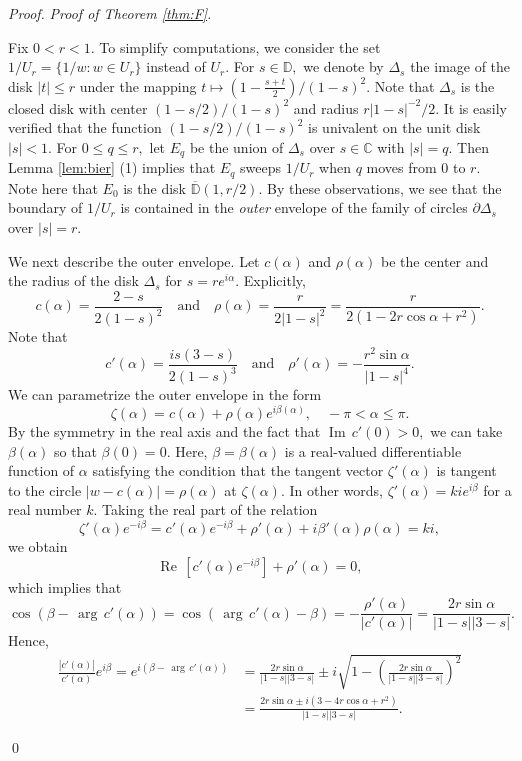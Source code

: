 \documentclass[a4paper,12pt]{amsart}
\numberwithin{equation}{section}
\theoremstyle{definition}
\newenvironment{pf}[1][]{ \vskip 3mm
 \noindent
 \ifthenelse{\equal{#1}{}}  {{\slshape Proof. }}  {{\slshape #1.} } }{\qed\bigskip}
\begin{document}
\begin{pf}[Proof of Theorem \ref{thm:F}]

Fix $0<r<1.$
To simplify computations, we consider the set $1/U_r=\{1/w: w\in U_r\}$
instead of $U_r.$
For $s\in{{\mathbb D}},$ we denote by $\Delta_s$ the image of
the disk $|t|\le r$ under the mapping 
$t\mapsto(1-\frac{s+t}2)/(1-s)^2.$
Note that $\Delta_s$ is the closed disk with center
$(1-s/2)/(1-s)^2$ and radius $r|1-s|^{-2}/2.$
It is easily verified that the function $(1-s/2)/(1-s)^2$ is
univalent on the unit disk $|s|<1.$
For $0\le q\le r,$
let $E_q$ be the union of $\Delta_s$ over $s\in{{\mathbb C}}$
with $|s|=q.$
Then Lemma \ref{lem:bier} (1) implies that 
$E_q$ sweeps $1/U_r$ when $q$ moves from $0$ to $r.$
Note here that $E_0$ is the disk ${{\overline{\mathbb D}}}(1,r/2).$
By these observations, we see that the boundary of $1/U_r$
is contained in the {\it outer} envelope of the family of
circles $\partial\Delta_s$ over $|s|=r.$

We next describe the outer envelope.
Let $c(\alpha)$ and $\rho(\alpha)$ be the center and the radius
of the disk $\Delta_s$ for $s=re^{i\alpha}.$
Explicitly,
$$
c(\alpha)=\frac{2-s}{2(1-s)^2}
{{\quad\text{and}\quad}}
\rho(\alpha)=\frac{r}{2|1-s|^2}=\frac{r}{2(1-2r\cos\alpha+r^2)}.
$$
Note that
$$
c'(\alpha)=\frac{is(3-s)}{2(1-s)^3}
{{\quad\text{and}\quad}}
\rho'(\alpha)=-\frac{r^2\sin\alpha}{|1-s|^4}.
$$
We can parametrize the outer envelope in the form
$$
\zeta(\alpha)=c(\alpha)+\rho(\alpha)e^{i\beta(\alpha)},\quad
-\pi<\alpha\le\pi.
$$
By the symmetry in the real axis and the fact that ${{\operatorname{Im}\,}} c'(0)>0,$
we can take $\beta(\alpha)$ so that $\beta(0)=0.$
Here, $\beta=\beta(\alpha)$ is a real-valued differentiable function 
of $\alpha$ satisfying the condition that the tangent vector
$\zeta'(\alpha)$ is tangent to the circle
$|w-c(\alpha)|=\rho(\alpha)$ at $\zeta(\alpha).$
In other words, $\zeta'(\alpha)=kie^{i\beta}$ for a real number $k.$
Taking the real part of the relation
$$
\zeta'(\alpha)e^{-i\beta}
=c'(\alpha)e^{-i\beta}+\rho'(\alpha)+i\beta'(\alpha)\rho(\alpha)=ki,
$$
we obtain
$$
{{\operatorname{Re}\,}}[c'(\alpha)e^{-i\beta}]+\rho'(\alpha)=0,
$$
which implies that
$$
\cos(\beta-{\,{\operatorname{arg}\,}} c'(\alpha))=
\cos({\,{\operatorname{arg}\,}} c'(\alpha)-\beta)=-\frac{\rho'(\alpha)}{|c'(\alpha)|}
=\frac{2r\sin\alpha}{|1-s||3-s|}.
$$
Hence,
\begin{align*}
\frac{|c'(\alpha)|}{c'(\alpha)}e^{i\beta}=
e^{i(\beta-{\,{\operatorname{arg}\,}} c'(\alpha))}
&=\frac{2r\sin\alpha}{|1-s||3-s|}
\pm i\sqrt{1-\left(\frac{2r\sin\alpha}{|1-s||3-s|}\right)^2} \\
&=\frac{2r\sin\alpha\pm i(3-4r\cos\alpha+r^2)}{|1-s||3-s|}.
\end{align*}


\end{pf}
\end{document}
